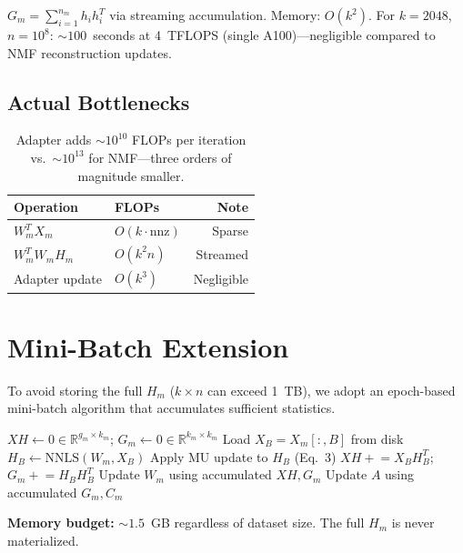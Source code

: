 \documentclass[10pt,twocolumn,letterpaper]{article}
\begin{document}
$G_m = \sum_{i=1}^{n_m} h_i h_i^T$ via streaming accumulation. Memory:
$O(k^2)$. For $k = 2048$, $n = 10^8$: ${\sim}100$~seconds at 4~TFLOPS
(single A100)---negligible compared to NMF reconstruction updates.

\subsection{Actual Bottlenecks}

\begin{table}[h]
\centering\small
\begin{tabular}{@{}llr@{}}
\toprule
Operation & FLOPs & Note \\
\midrule
$W_m^T X_m$ & $O(k \cdot \text{nnz})$ & Sparse \\
$W_m^T W_m H_m$ & $O(k^2 n)$ & Streamed \\
Adapter update & $O(k^3)$ & Negligible \\
\bottomrule
\end{tabular}
\caption{Adapter adds ${\sim}10^{10}$ FLOPs per iteration vs.\
${\sim}10^{13}$ for NMF---three orders of magnitude smaller.}
\end{table}

\section{Mini-Batch Extension}

To avoid storing the full $H_m$ ($k \times n$ can exceed 1~TB), we adopt an
epoch-based mini-batch algorithm that accumulates sufficient statistics.

\begin{algorithm}[h]
\caption{Mini-Batch Cycle-Consistent Adapter NMF}
\begin{algorithmic}[1]
  \State $XH \gets 0 \in \mathbb{R}^{g_m \times k_m}$;
         $G_m \gets 0 \in \mathbb{R}^{k_m \times k_m}$
    \State Load $X_B = X_m[:, B]$ from disk
    \State $H_B \gets \text{NNLS}(W_m, X_B)$
    \State Apply MU update to $H_B$ (Eq.~3)
    \State $XH \mathrel{+}= X_B H_B^T$; \;
           $G_m \mathrel{+}= H_B H_B^T$
  \EndFor
  \State Update $W_m$ using accumulated $XH, G_m$
  \State Update $A$ using accumulated $G_m, C_m$
\EndFor
\end{algorithmic}
\end{algorithm}

\textbf{Memory budget:} ${\sim}1.5$~GB regardless of dataset size. The full
$H_m$ is never materialized.
\end{document}
